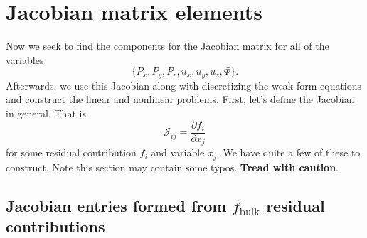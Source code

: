 \documentclass[16pt]{article} %
\begin{document}
\section{Jacobian matrix elements}
%
Now we seek to find the components for the Jacobian matrix for all of the variables 
%
\Large
$$\{P_x, P_y, P_z, u_x, u_y, u_z, \Phi \}.$$
\normalsize
%
Afterwards, we use this Jacobian along with discretizing the weak-form equations and construct the linear and nonlinear problems.
%
First, let's define the Jacobian in general.
%
That is
%
$$\mathscr{J}_{ij} = \frac{\partial f_i}{\partial x_j}$$
%
for some residual contribution $f_i$ and variable $x_j$.
% 
We have quite a few of these to construct.
%
Note this section may contain some typos.
%
\textbf{Tread with caution}. 
%
\subsection{Jacobian entries formed from $f_\mathrm{bulk}$ residual contributions}
%
\end{document}
